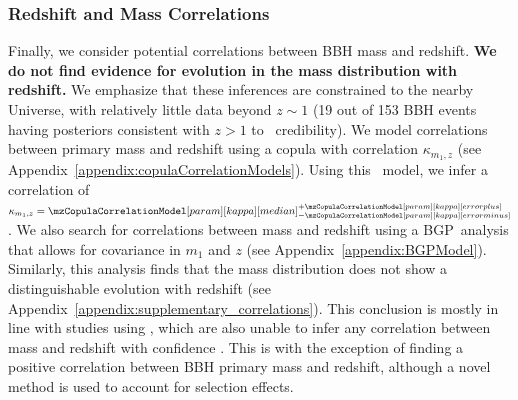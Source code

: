 \subsubsection{Redshift and Mass Correlations}
\label{subsubsec:redshift_mass_correlations}
Finally, we consider potential correlations between BBH mass and redshift.
\textbf{We do not find evidence for evolution in the mass distribution with redshift.}
We emphasize that these inferences are constrained to the nearby Universe, with relatively little data beyond $z \sim 1$ (19 out of 153 \ac{BBH} events having posteriors consistent with $z>1$ to \confidenceLevel~credibility).
We model correlations between primary mass and redshift using a copula with correlation $\kappa_{m_1, z}$ (see Appendix~\ref{appendix:copulaCorrelationModels}).
Using this \copulacorrelation~model, we infer a correlation of $\kappa_{m_1, z} = \CIPlusMinus{\mzCopulaCorrelationModel[param][kappa]}$.
We also search for correlations between mass and redshift using a \ac{BGP}~analysis that allows for covariance in $m_1$ and $z$ (see Appendix~\ref{appendix:BGPModel}).
Similarly, this analysis finds that the mass distribution does not show a distinguishable evolution with redshift (see Appendix~\ref{appendix:supplementary_correlations}).
This conclusion is mostly in line with studies using \gwtcthree, which are also unable to infer any correlation between mass and redshift with confidence \citep{Fishbach:2021yvy, Sadiq:2021fin, vanSon:2021zpk, Karathanasis:2022rtr, Ray:2023upk, Heinzel:2023hlb, Heinzel:2024hva, Lalleman:2025xcs, Sadiq:2025aog}.
This is with the exception of \cite{Rinaldi:2023bbd} finding a positive correlation between \ac{BBH} primary mass and redshift, although a novel method is used to account for selection effects.

